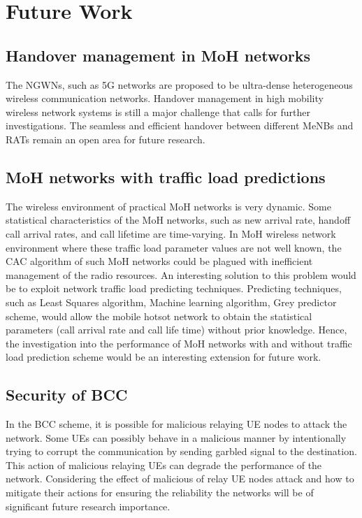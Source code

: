  
\section{Future Work}\label{sec:FutureWork6}
 
 \subsection{Handover management in MoH networks} \label{subsec:MobileHotspot}
The NGWNs, such as 5G networks are proposed to be ultra-dense heterogeneous wireless communication networks.  Handover management in high mobility wireless network systems is still a major challenge that calls for further investigations. The seamless and efficient handover between different MeNBs and RATs remain an open area for future research.

 \subsection{ MoH networks with traffic load predictions} \label{subsec:loadPredictionMobileHotspot}

The wireless environment of practical MoH  networks is very dynamic. Some statistical characteristics of the MoH networks,
such as new arrival rate, handoff call arrival rates, and call lifetime  are time-varying. In MoH wireless network environment where  
these traffic load parameter values are not well known, the CAC algorithm  of  such MoH networks could be plagued  with inefficient management of the radio resources. An interesting solution to this problem would be to exploit network traffic load  predicting techniques.  Predicting techniques,  such as  Least Squares algorithm, Machine learning algorithm, Grey predictor scheme, would allow the mobile hotsot network to obtain the statistical parameters (call arrival rate and call life time) without prior knowledge. Hence, the investigation into the performance of MoH networks  with and without traffic load prediction scheme would  be an interesting extension for future work.



 \subsection{ Security of BCC }\label{subsec:Securityofbufferedcooperativecommunication}
In the BCC scheme,  it is possible for malicious relaying UE nodes to attack the network. Some UEs can possibly behave in a malicious manner by intentionally trying to corrupt the communication by sending  garbled signal to the  destination.  This action of  malicious relaying UEs can degrade the performance of the network.  Considering the effect of malicious  of relay  UE nodes attack and how to mitigate their actions  for ensuring the reliability the networks will be of  significant future research importance. 





